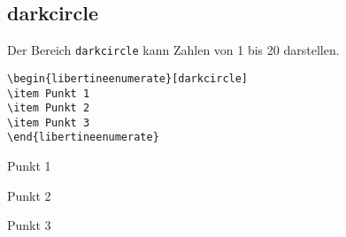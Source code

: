 \documentclass[ngerman]{libertinedoku}
\begin{document}
\subsection{darkcircle}

Der Bereich \texttt{darkcircle} kann Zahlen von 1 bis 20 darstellen.


\begin{minipage}{\linewidth}
\begin{minipage}{.48\linewidth}
\begin{lstlisting}
\begin{libertineenumerate}[darkcircle]
\item Punkt 1
\item Punkt 2
\item Punkt 3
\end{libertineenumerate}
\end{lstlisting}
\end{minipage}\hfill
\begin{minipage}{.48\linewidth}
\begin{libertineenumerate}[darkcircle]
\item Punkt 1
\item Punkt 2
\item Punkt 3
\end{libertineenumerate}
\end{minipage}
\end{minipage}
\end{document}
